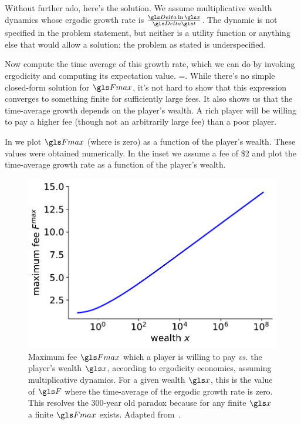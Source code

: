 Without further ado, here's the solution. We assume multiplicative wealth dynamics
whose ergodic growth rate is $\frac{\D \ln \x}{\D \t}$. The dynamic is not specified
in the problem statement, but neither is a utility function or anything else that would allow
a solution: the problem as stated is underspecified.

Now compute the time average of this growth rate, which we can do by invoking ergodicity
and computing its expectation value.
\be
\frac{\ave{\D \ln \x}}{\D \t}=\frac{\ave{\ln(\x+\q-\F)}-\ln(\x)}{\D\t}.
\ee
While there's no simple closed-form solution for $\Fmax$, it's not hard to 
show that this expression converges to something finite for sufficiently large fees. 
It also shows us that the time-average growth depends on the player's wealth.
A rich player will be willing to pay a higher fee (though not an arbitrarily 
large fee) than a poor player.

In  we plot $\Fmax$ (where  is zero) as a 
function of the player's wealth. These values were obtained numerically.
In the inset we assume a fee of \$2 and plot the time-average growth 
rate  as a function of the player's wealth. 
\begin{figure}
\centering
\includegraphics[width=.5\textwidth]{./chapter_real/figs/Fmax.pdf}
\caption{Maximum fee $\Fmax$ which a player is willing to pay {\it vs.} the 
player's wealth $\x$, 
according to ergodicity economics, assuming multiplicative dynamics. 
For a given wealth $\x$, this is the value of $\F$ where the time-average of the ergodic 
growth rate  is zero. This 
resolves the 300-year old paradox because for any finite $\x$ a finite $\Fmax$ exists. 
Adapted from~\cite{Peters2011b}.}
\end{figure}

